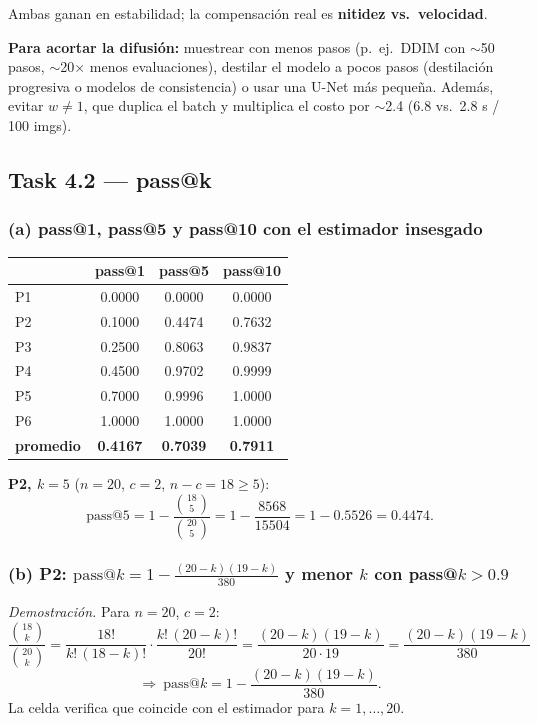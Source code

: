 \documentclass[11pt]{article}
\begin{document}
Ambas ganan en estabilidad; la compensación real es \textbf{nitidez vs.\ velocidad}.

\textbf{Para acortar la difusión:} muestrear con menos pasos (p.\ ej.\ DDIM con $\sim$50 pasos, $\sim$20$\times$ menos evaluaciones), destilar el modelo a pocos pasos (destilación progresiva o modelos de consistencia) o usar una U-Net más pequeña. Además, evitar $w\neq1$, que duplica el batch y multiplica el costo por $\sim$2.4 (6.8 vs.\ 2.8 s / 100 imgs).

\subsection*{Task 4.2 --- pass@k}

\subsubsection*{(a) pass@1, pass@5 y pass@10 con el estimador insesgado}
\begin{table}[H]
\centering
\begin{tabular}{lccc}
\toprule
 & pass@1 & pass@5 & pass@10 \\
\midrule
P1 & 0.0000 & 0.0000 & 0.0000 \\
P2 & 0.1000 & 0.4474 & 0.7632 \\
P3 & 0.2500 & 0.8063 & 0.9837 \\
P4 & 0.4500 & 0.9702 & 0.9999 \\
P5 & 0.7000 & 0.9996 & 1.0000 \\
P6 & 1.0000 & 1.0000 & 1.0000 \\
\midrule
\textbf{promedio} & \textbf{0.4167} & \textbf{0.7039} & \textbf{0.7911} \\
\bottomrule
\end{tabular}
\end{table}

\textbf{P2, $k=5$} ($n=20$, $c=2$, $n-c=18\ge5$):
\[\text{pass@5}=1-\frac{\binom{18}{5}}{\binom{20}{5}}=1-\frac{8568}{15504}=1-0.5526=\mathbf{0.4474}.\]

\subsubsection*{(b) P2: $\text{pass@}k=1-\frac{(20-k)(19-k)}{380}$ y menor $k$ con pass@$k>0.9$}
\emph{Demostración.} Para $n=20$, $c=2$:
\[\frac{\binom{18}{k}}{\binom{20}{k}}=\frac{18!}{k!\,(18-k)!}\cdot\frac{k!\,(20-k)!}{20!}=\frac{(20-k)(19-k)}{20\cdot19}=\frac{(20-k)(19-k)}{380}\]
\[\Rightarrow\ \text{pass@}k=1-\frac{(20-k)(19-k)}{380}.\]
La celda verifica que coincide con el estimador para $k=1,\dots,20$.
\end{document}
